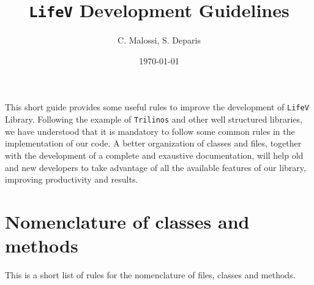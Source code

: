 \documentclass[a4paper]{article}
\title{\texttt{LifeV} Development Guidelines}
\author{C. Malossi, S. Deparis}
\date{\today}
\begin{document}
\maketitle

This short guide provides some useful rules to improve the
development of \texttt{LifeV} Library. Following the example of
\texttt{Trilinos} and other well structured libraries, we have understood that
it is mandatory to follow some common rules in the implementation of our code. 
A better organization of classes and files, together with the development of a
complete and exaustive documentation, will help old and new developers to
take advantage of all the available features of our library, improving
productivity and results.

\section{Nomenclature of classes and methods}
This is a short list of rules for the nomenclature of files, classes and
methods.
\end{document}
